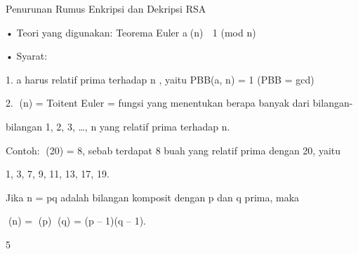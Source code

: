\documentclass{article}
\begin{document}

Penurunan Rumus Enkripsi dan Dekripsi RSA

• Teori yang digunakan: Teorema Euler    a(n)  1 (mod n) 

• Syarat: 

1. a harus relatif prima terhadap n , yaitu PBB(a, n) = 1          (PBB = gcd)

2. (n) = Toitent Euler = fungsi yang menentukan berapa  banyak  dari bilangan-

bilangan 1, 2, 3, …, n yang relatif prima terhadap n.


Contoh: (20) = 8, sebab terdapat 8 buah  yang relatif  prima dengan 20, yaitu  

1, 3, 7, 9, 11, 13, 17, 19. 


      Jika n = pq adalah bilangan komposit dengan p dan q  prima, maka

             (n) = (p) (q) = (p – 1)(q – 1).

5
\end{document}
